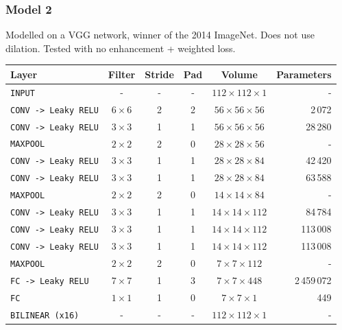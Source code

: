 \documentclass{beamer}
\begin{document}
	\begin{frame}
		\frametitle{Model 2}
		Modelled on a VGG network, winner of the 2014 ImageNet. Does not use dilation. Tested with no enhancement + weighted loss.
		
		\footnotesize
		\begin{table}
			\centering
			\begin{tabular}{lccccr}
			\hline
			\textbf{Layer} & \textbf{Filter} & \textbf{Stride} &\textbf{Pad} & \textbf{Volume} & \textbf{Parameters} \\
			\hline
			\texttt{INPUT}	& -	& - & - & $112 \times 112 \times 1$ & -\\
			\texttt{CONV -> Leaky RELU} & $6 \times 6$ & 2 & 2 & $56 \times 56 \times 56$ & 2\,072\\
			\texttt{CONV -> Leaky RELU} & $3 \times 3$ & 1 & 1 & $56 \times 56 \times 56$ & 28\,280\\
			\texttt{MAXPOOL} & $2 \times 2$ & 2 & 0 & $28 \times 28 \times 56$ & -\\
			\texttt{CONV -> Leaky RELU} & $3 \times 3$ & 1 & 1 & $28 \times 28 \times 84$ & 42\,420\\
			\texttt{CONV -> Leaky RELU} & $3 \times 3$ & 1 & 1 & $28 \times 28 \times 84$ & 63\,588\\
			\texttt{MAXPOOL} & $2 \times 2$ & 2 & 0 & $14 \times 14 \times 84$ & -\\
			\texttt{CONV -> Leaky RELU} & $3 \times 3$ & 1 & 1 & $14 \times 14 \times 112$ & 84\,784\\
			\texttt{CONV -> Leaky RELU} & $3 \times 3$ & 1 & 1 & $14 \times 14 \times 112$ & 113\,008\\
			\texttt{CONV -> Leaky RELU} & $3 \times 3$ & 1 & 1 & $14 \times 14 \times 112$ & 113\,008\\
			\texttt{MAXPOOL} & $2 \times 2$ & 2 & 0 & $7 \times 7 \times 112$ & -\\
			\texttt{FC -> Leaky RELU} & $7 \times 7$ & 1 & 3 & $7 \times 7 \times 448$ & 2\,459\,072\\
			\texttt{FC} & $1 \times 1$ & 1 & 0 & $7 \times 7 \times 1$ & 449 \\
			\texttt{BILINEAR (x16)} & - & - & - & $112 \times 112 \times 1$ & -\\
			\hline
			\end{tabular}
		\end{table}
	\end{frame}
	
\end{document}
